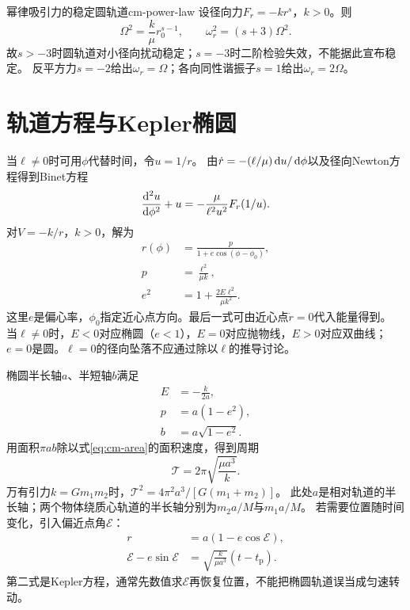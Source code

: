 \begin{example}{幂律吸引力的稳定圆轨道}{cm-power-law}
设径向力$F_r = -kr^s$，$k > 0$。则
\begin{equation}
 \Omega^2 = \frac{k}{\mu}r_0^{s-1},\qquad
 \omega_r^2 = (s + 3)\Omega^2.
\end{equation}
故$s > -3$时圆轨道对小径向扰动稳定；$s = -3$时二阶检验失效，不能据此宣布稳定。
反平方力$s = -2$给出$\omega_r = \Omega$；各向同性谐振子$s = 1$给出$\omega_r = 2\Omega$。
\end{example}

\section{轨道方程与Kepler椭圆}
当$\ell \ne 0$时可用$\phi$代替时间，令$u = 1/r$。
由$\dot r = -(\ell/\mu)\d u/\d\phi$以及径向Newton方程得到Binet方程
\begin{equation}
 \dv[2]{u}{\phi} + u = -\frac{\mu}{\ell^2u^2}F_r(1/u).
\end{equation}
对$V = -k/r$，$k > 0$，解为
\begin{subequations}
 \begin{align}
  r(\phi) &= \frac{p}{1 + e\cos(\phi - \phi_0)}, \label{eq:cm-conic}\\
  p &= \frac{\ell^2}{\mu k},\\
  e^2 &= 1 + \frac{2E\ell^2}{\mu k^2}.
 \end{align}
\end{subequations}
这里$e$是偏心率，$\phi_0$指定近心点方向。最后一式可由近心点$\dot r = 0$代入能量得到。
当$\ell \ne 0$时，$E < 0$对应椭圆（$e < 1$），$E = 0$对应抛物线，$E > 0$对应双曲线；
$e = 0$是圆。$\ell = 0$的径向坠落不应通过除以$\ell$的推导讨论。

椭圆半长轴$a$、半短轴$b$满足
\begin{subequations}
 \begin{align}
  E &= -\frac{k}{2a},\\
  p &= a(1 - e^2),\\
  b &= a\sqrt{1 - e^2}.
 \end{align}
\end{subequations}
用面积$\pi ab$除以式\eqref{eq:cm-area}的面积速度，得到周期
\begin{equation}
 \mathcal T = 2\pi\sqrt{\frac{\mu a^3}{k}}.
\end{equation}
万有引力$k = Gm_1m_2$时，$\mathcal T^2 = 4\pi^2a^3/[G(m_1 + m_2)]$。
此处$a$是相对轨道的半长轴；两个物体绕质心轨道的半长轴分别为$m_2a/M$与$m_1a/M$。
若需要位置随时间变化，引入偏近点角$\mathcal E$：
\begin{subequations}
 \begin{align}
  r &= a(1 - e\cos\mathcal E),\\
  \mathcal E - e\sin\mathcal E &= \sqrt{\frac{k}{\mu a^3}}(t - t_{\mathrm{p}}).
 \end{align}
\end{subequations}
第二式是Kepler方程，通常先数值求$\mathcal E$再恢复位置，不能把椭圆轨道误当成匀速转动。

